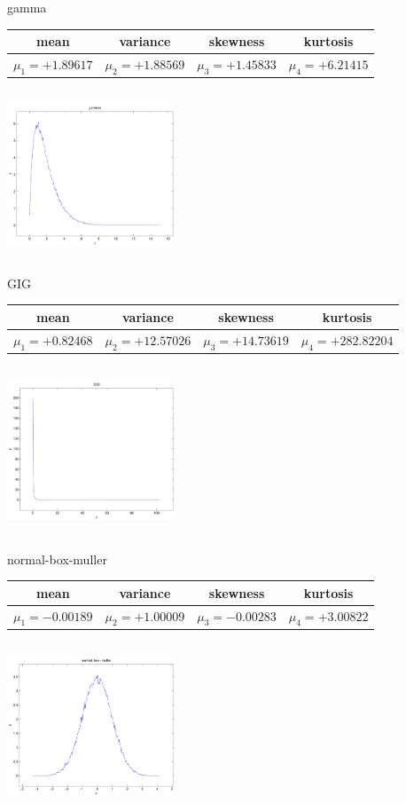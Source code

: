 \documentclass[9pt]{article}
\theoremstyle{plain}
\theoremstyle{definition}
\theoremstyle{remark}
\numberwithin{equation}{section}
\begin{document}
\newpage
gamma \begin{tabular}{|c|c|c|c|}  mean & variance & skewness & kurtosis \\  \hline
$\mu_1 = +1.89617$ & $\mu_2 = +1.88569$ & $\mu_3 = +1.45833$ & $\mu_4 =+6.21415$ \\
\end{tabular}

\includegraphics[width=5cm,height=5cm]{gamma.pdf}

GIG \begin{tabular}{|c|c|c|c|}  mean & variance & skewness & kurtosis \\  \hline
$\mu_1 = +0.82468$ & $\mu_2 = +12.57026$ & $\mu_3 = +14.73619$ & $\mu_4 =+282.82204$ \\
\end{tabular}

\includegraphics[width=5cm,height=5cm]{GIG.pdf}

normal-box-muller \begin{tabular}{|c|c|c|c|}  mean & variance & skewness & kurtosis \\  \hline
$\mu_1 = -0.00189$ & $\mu_2 = +1.00009$ & $\mu_3 = -0.00283$ & $\mu_4 =+3.00822$ \\
\end{tabular}

\includegraphics[width=5cm,height=5cm]{normal-box-muller.pdf}
\end{document}
